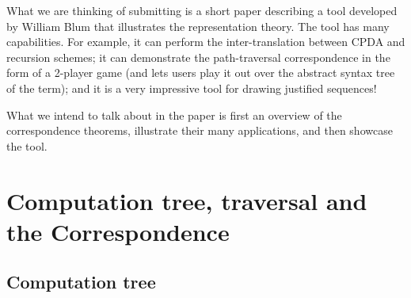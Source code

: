 What we are thinking of submitting is a short paper describing a
tool developed by William Blum that illustrates the representation
theory. The tool has many capabilities. For example, it can perform
the inter-translation between CPDA and recursion schemes; it can
demonstrate the path-traversal correspondence in the form of a
2-player game (and lets users play it out over the abstract syntax
tree of the term); and it is a very impressive tool for drawing
justified sequences!

What we intend to talk about in the paper is first an overview of
the correspondence theorems, illustrate their many applications, and
then showcase the tool.

\section{Computation tree, traversal and the Correspondence}
\subsection{Computation tree}





    
    


